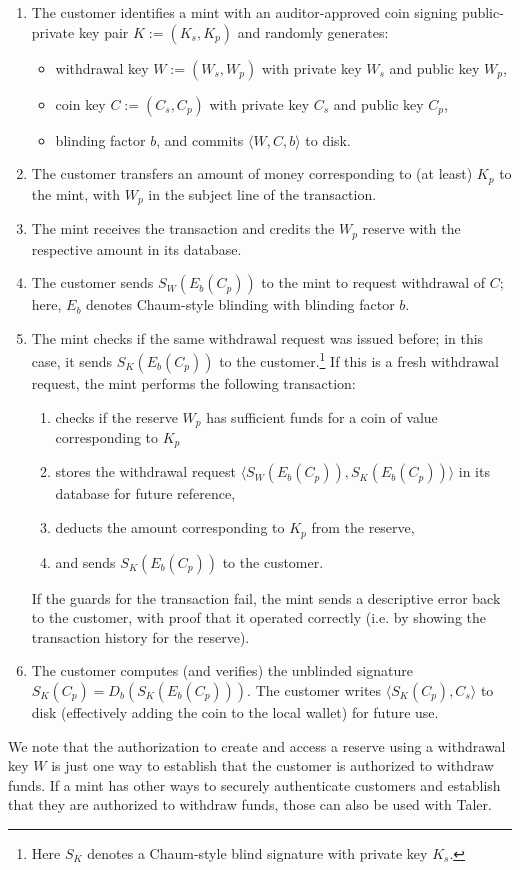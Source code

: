 \documentclass{llncs}
\begin{document}
\begin{enumerate}
  \item The customer identifies a mint with an auditor-approved
        coin signing public-private key pair $K := (K_s, K_p)$
        and randomly generates:
        \begin{itemize}
           \item withdrawal key $W := (W_s,W_p)$ with private key $W_s$ and public key $W_p$,
           \item coin key $C := (C_s,C_p)$ with private key $C_s$ and public key $C_p$,
           \item blinding factor $b$, and commits $\langle W, C, b \rangle$ to disk.
        \end{itemize}
  \item The customer transfers an amount of money corresponding to (at least) $K_p$ to the mint, with $W_p$ in the subject line of the transaction.
  \item The mint receives the transaction and credits the $W_p$ reserve with the respective amount in its database.
  \item The customer sends $S_W(E_b(C_p))$ to the mint to request withdrawal of $C$; here, $E_b$ denotes Chaum-style blinding with blinding factor $b$.
  \item The mint checks if the same withdrawal request was issued before; in this case, it sends $S_{K}(E_b(C_p))$ to the customer.\footnote{Here $S_K$
        denotes a Chaum-style blind signature with private key $K_s$.}
        If this is a fresh withdrawal request, the mint performs the following transaction:
        \begin{enumerate}
           \item checks if the reserve $W_p$ has sufficient funds for a coin of value corresponding to $K_p$
           \item stores the withdrawal request $\langle S_W(E_b(C_p)), S_K(E_b(C_p)) \rangle$ in its database for future reference,
           \item deducts the amount corresponding to $K_p$ from the reserve,
           \item and sends $S_{K}(E_b(C_p))$ to the customer.
        \end{enumerate}
        If the guards for the transaction fail, the mint sends a descriptive error back to the customer,
        with proof that it operated correctly (i.e. by showing the transaction history for the reserve).
  \item The customer computes (and verifies) the unblinded signature $S_K(C_p) = D_b(S_K(E_b(C_p)))$.
        The customer writes $\langle S_K(C_p), C_s \rangle$ to disk (effectively adding the coin to the
        local wallet) for future use.
\end{enumerate}
We note that the authorization to create and access a reserve using a
withdrawal key $W$ is just one way to establish that the customer is
authorized to withdraw funds.  If a mint has other ways to securely
authenticate customers and establish that they are authorized to
withdraw funds, those can also be used with Taler.
\end{document}
